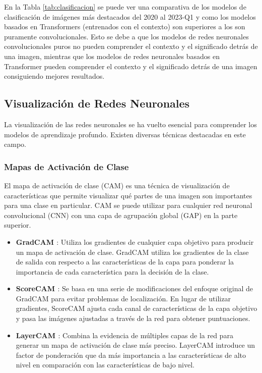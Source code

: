 \documentclass[10pt,a4paper,twocolumn,twoside]{article}
\begin{document}
En la Tabla \ref{tab:clasificacion} se puede ver una comparativa de los modelos de clasificación de
imágenes más destacados del 2020 al 2023-Q1 y como los modelos basados en Transformers (entrenados con el contexto) son superiores
a los son puramente convolucionales. Esto se debe a que los modelos de redes
neuronales convolucionales puros no pueden comprender el contexto y el significado detrás de
una imagen, mientras que los modelos de redes neuronales basados en Transformer pueden
comprender el contexto y el significado detrás de una imagen consiguiendo mejores resultados.

\subsection{Visualización de Redes Neuronales}

La visualización de las redes neuronales se ha vuelto esencial para comprender los modelos de aprendizaje profundo. Existen diversas técnicas destacadas en este campo.

\subsubsection{Mapas de Activación de Clase}

El mapa de activación de clase (CAM) es una técnica de visualización de características que permite visualizar qué partes de una imagen son importantes para una clase en particular. CAM se puede utilizar para cualquier red neuronal convolucional (CNN) con una capa de agrupación global (GAP) en la parte superior.\\

\begin{itemize}
    \item \textbf{GradCAM \cite{grad_cam}}: Utiliza los gradientes de cualquier capa objetivo para producir un mapa de activación de clase. GradCAM utiliza los gradientes de la clase de salida con respecto a las características de la capa para ponderar la importancia de cada característica para la decisión de la clase.
    \item \textbf{ScoreCAM \cite{ScoreCAM}}: Se basa en una serie de modificaciones del enfoque original de GradCAM para evitar problemas de localización. En lugar de utilizar gradientes, ScoreCAM ajusta cada canal de características de la capa objetivo y pasa las imágenes ajustadas a través de la red para obtener puntuaciones.
    \item \textbf{LayerCAM \cite{LayerCAM}}: Combina la evidencia de múltiples capas de la red para generar un mapa de activación de clase más preciso. LayerCAM introduce un factor de ponderación que da más importancia a las características de alto nivel en comparación con las características de bajo nivel.
\end{itemize}
\end{document}
